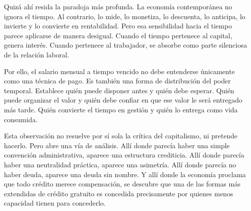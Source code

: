\documentclass[12pt,a4paper]{article}
\begin{document}
Quizá ahí resida la paradoja más profunda. La economía contemporánea no ignora el tiempo. Al contrario, lo mide, lo monetiza, lo descuenta, lo anticipa, lo invierte y lo convierte en rentabilidad. Pero esa sensibilidad hacia el tiempo parece aplicarse de manera desigual. Cuando el tiempo pertenece al capital, genera interés. Cuando pertenece al trabajador, se absorbe como parte silenciosa de la relación laboral.

Por ello, el salario mensual a tiempo vencido no debe entenderse únicamente como una técnica de pago. Es también una forma de distribución del poder temporal. Establece quién puede disponer antes y quién debe esperar. Quién puede organizar el valor y quién debe confiar en que ese valor le será entregado más tarde. Quién convierte el tiempo en gestión y quién lo entrega como vida consumida.

Esta observación no resuelve por sí sola la crítica del capitalismo, ni pretende hacerlo. Pero abre una vía de análisis. Allí donde parecía haber una simple convención administrativa, aparece una estructura crediticia. Allí donde parecía haber una neutralidad práctica, aparece una asimetría. Allí donde parecía no haber deuda, aparece una deuda sin nombre. Y allí donde la economía proclama que todo crédito merece compensación, se descubre que una de las formas más extendidas de crédito gratuito es concedida precisamente por quienes menos capacidad tienen para concederlo.
\end{document}
